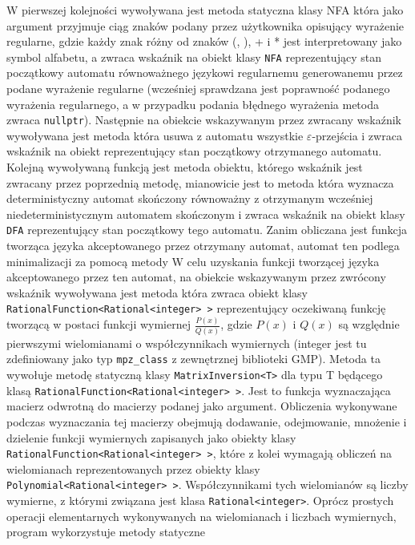 W pierwszej kolejności wywoływana jest metoda statyczna klasy NFA
która jako argument przyjmuje ciąg znaków podany przez użytkownika opisujący wyrażenie regularne, gdzie każdy znak różny od znaków (, ), + i * jest interpretowany jako symbol alfabetu, a zwraca wskaźnik na obiekt klasy \texttt{NFA} reprezentujący stan początkowy automatu równoważnego językowi regularnemu generowanemu przez podane wyrażenie regularne (wcześniej sprawdzana jest poprawność podanego wyrażenia regularnego, a w przypadku podania błędnego wyrażenia metoda zwraca \texttt{nullptr}). Następnie na obiekcie wskazywanym przez zwracany wskaźnik wywoływana jest metoda
która usuwa z automatu wszystkie $\varepsilon$-przejścia i zwraca wskaźnik na obiekt reprezentujący stan początkowy otrzymanego automatu. Kolejną wywoływaną funkcją jest metoda obiektu, którego wskaźnik jest zwracany przez poprzednią metodę, mianowicie jest to metoda
która wyznacza deterministyczny automat skończony równoważny z otrzymanym wcześniej niedeterministycznym automatem skończonym i zwraca wskaźnik na obiekt klasy \texttt{DFA} reprezentujący stan początkowy tego automatu. Zanim obliczana jest funkcja tworząca języka akceptowanego przez otrzymany automat, automat ten podlega minimalizacji za pomocą metody
W celu uzyskania funkcji tworzącej języka akceptowanego przez ten automat, na obiekcie wskazywanym przez zwrócony wskaźnik wywoływana jest metoda
która zwraca obiekt klasy \texttt{RationalFunction<Rational<integer> >} reprezentujący oczekiwaną funkcję tworzącą w postaci funkcji wymiernej $\frac{P(x)}{Q(x)}$, gdzie $P(x)$ i $Q(x)$ są względnie pierwszymi wielomianami o współczynnikach wymiernych (integer jest tu zdefiniowany jako typ \texttt{mpz_class} z zewnętrznej biblioteki GMP). Metoda ta wywołuje metodę statyczną klasy \texttt{MatrixInversion<T>}
dla typu T będącego klasą \texttt{RationalFunction<Rational<integer> >}. Jest to funkcja wyznaczająca macierz odwrotną do macierzy podanej jako argument. Obliczenia wykonywane podczas wyznaczania tej macierzy obejmują dodawanie, odejmowanie, mnożenie i dzielenie funkcji wymiernych zapisanych jako obiekty klasy \texttt{RationalFunction<Rational<integer> >}, które z kolei wymagają obliczeń na wielomianach reprezentowanych przez obiekty klasy \texttt{Polynomial<Rational<integer> >}. Współczynnikami tych wielomianów są liczby wymierne, z którymi związana jest klasa \texttt{Rational<integer>}. Oprócz prostych operacji elementarnych wykonywanych na wielomianach i liczbach wymiernych, program wykorzystuje metody statyczne
